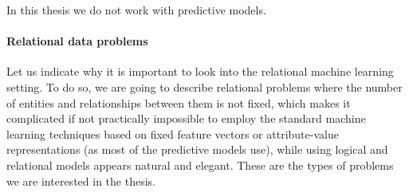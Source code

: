 In this thesis we do not work with predictive models.
 
\paragraph{Relational data problems} Let us indicate why it is important to look into the relational
machine learning setting. To do so, we are going to describe
relational problems where
the number of entities and relationships between them is not fixed,
which makes it complicated if not practically impossible to employ the
standard machine learning techniques based on  fixed feature vectors
or attribute-value representations (as most of the predictive models
use), while using logical and relational
models appears natural and elegant.  These are the types of problems
we are interested in the thesis.


%       



